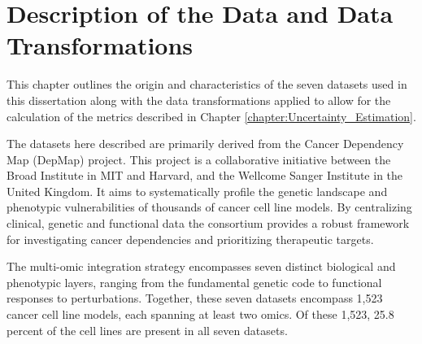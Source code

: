 
%
%
%
%


\chapter{Description of the Data and Data Transformations} \label{chapter:Data} \label{chapter:Data_Description}


This chapter outlines the origin and characteristics of the seven datasets used in this dissertation along with the data transformations applied to allow for the calculation of the metrics described in Chapter \ref{chapter:Uncertainty_Estimation}.

The datasets here described are primarily derived from the Cancer Dependency Map (DepMap) project. This project is a collaborative initiative between the Broad Institute in MIT and Harvard, and the Wellcome Sanger Institute in the United Kingdom. It aims to systematically profile the genetic landscape and phenotypic vulnerabilities of thousands of cancer cell line models. By centralizing clinical, genetic and functional data the consortium provides a robust framework for investigating cancer dependencies and prioritizing therapeutic targets. 


The multi-omic integration strategy encompasses seven distinct biological and phenotypic layers, ranging from the fundamental genetic code to functional responses to perturbations. Together, these seven datasets encompass 1,523 cancer cell line models, each spanning at least two omics. Of these 1,523, 25.8 percent of the cell lines are present in all seven datasets.

